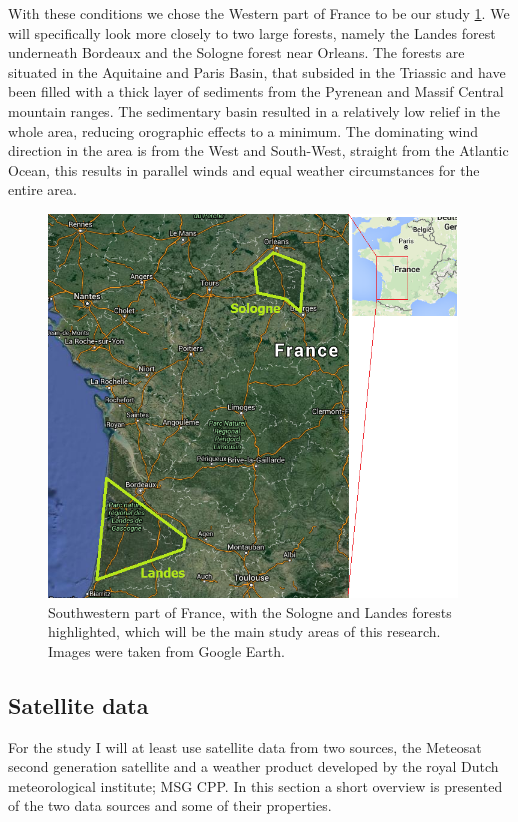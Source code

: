 \documentclass{article}
\begin{document}
With these conditions we chose the Western part of France to be our study  \ref{fig:studyarea}. We will specifically look more closely to two large forests, namely the Landes forest underneath Bordeaux and the Sologne forest near Orleans. The forests are situated in the Aquitaine and Paris Basin, that subsided in the Triassic and have been filled with a thick layer of sediments from the Pyrenean and Massif Central mountain ranges. The sedimentary basin resulted in a relatively low relief in the whole area, reducing orographic effects to a minimum. The dominating wind direction in the area is from the West and South-West, straight from the Atlantic Ocean, this results in parallel winds and equal weather circumstances for the entire area.

\begin{figure}[H]
	\centering
	\includegraphics[height=4in]{figures/Study_area.png}
	\caption[Optional caption]{Southwestern part of France, with the Sologne and Landes forests highlighted, which will be the main study areas of this research. Images were taken from Google Earth.}
	\label{fig:studyarea}
\end{figure}


\subsection{Satellite data}
For the study I will at least use satellite data from two sources, the Meteosat second generation satellite and a weather product developed by the royal Dutch meteorological institute; MSG CPP. In this section a short overview is presented of the two data sources and some of their properties.
\end{document}
